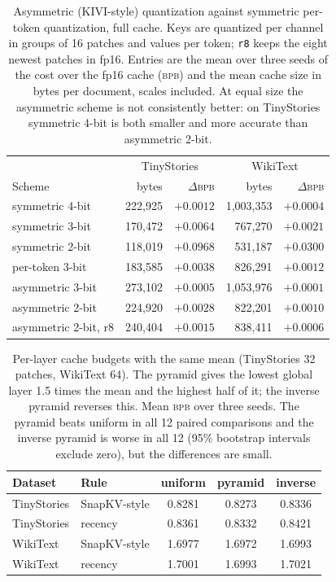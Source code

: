 \documentclass[10pt]{article}
\newcommand{\bpb}{\textsc{bpb}}
\begin{document}
\begin{table}[h]
\centering\footnotesize
\caption{Asymmetric (KIVI-style) quantization against symmetric per-token quantization, full cache. Keys are quantized per channel in groups of 16 patches and values per token; \texttt{r8} keeps the eight newest patches in fp16. Entries are the mean over three seeds of the cost over the fp16 cache (\bpb) and the mean cache size in bytes per document, scales included. At equal size the asymmetric scheme is not consistently better: on TinyStories symmetric 4-bit is both smaller and more accurate than asymmetric 2-bit.}
\begin{tabular}{lrrrr}
\toprule
 & \multicolumn{2}{c}{TinyStories} & \multicolumn{2}{c}{WikiText} \\
Scheme & bytes & $\Delta$\bpb & bytes & $\Delta$\bpb \\
\midrule
symmetric 4-bit & 222,925 & $+0.0012$ & 1,003,353 & $+0.0004$ \\
symmetric 3-bit & 170,472 & $+0.0064$ & 767,270 & $+0.0021$ \\
symmetric 2-bit & 118,019 & $+0.0968$ & 531,187 & $+0.0300$ \\
per-token 3-bit & 183,585 & $+0.0038$ & 826,291 & $+0.0012$ \\
asymmetric 3-bit & 273,102 & $+0.0005$ & 1,053,976 & $+0.0001$ \\
asymmetric 2-bit & 224,920 & $+0.0028$ & 822,201 & $+0.0010$ \\
asymmetric 2-bit, r8 & 240,404 & $+0.0015$ & 838,411 & $+0.0006$ \\
\bottomrule
\end{tabular}
\end{table}

\begin{table}[h]
\centering\footnotesize
\caption{Per-layer cache budgets with the same mean (TinyStories 32 patches, WikiText 64). The pyramid gives the lowest global layer 1.5 times the mean and the highest half of it; the inverse pyramid reverses this. Mean \bpb{} over three seeds. The pyramid beats uniform in all 12 paired comparisons and the inverse pyramid is worse in all 12 (95\% bootstrap intervals exclude zero), but the differences are small.}
\begin{tabular}{llccc}
\toprule
Dataset & Rule & uniform & pyramid & inverse \\
\midrule
TinyStories & SnapKV-style & 0.8281 & 0.8273 & 0.8336 \\
TinyStories & recency & 0.8361 & 0.8332 & 0.8421 \\
WikiText & SnapKV-style & 1.6977 & 1.6972 & 1.6993 \\
WikiText & recency & 1.7001 & 1.6993 & 1.7021 \\
\bottomrule
\end{tabular}
\end{table}
\end{document}
